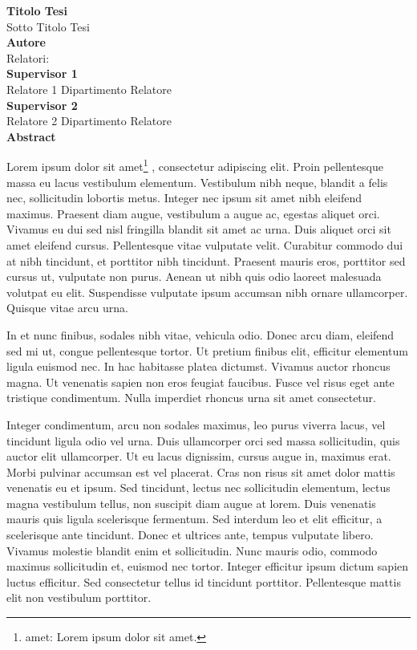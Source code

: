 \thispagestyle{plain}
\begin{center}
    \Large
    \textbf{Titolo Tesi\\}
    \vspace{0.4cm}
    \large
    Sotto Titolo Tesi\\
    \vspace{0.4cm}
    \textbf{Autore\\}
    \vspace{0.2cm}
    Relatori:\\
    \vspace{0.2cm}
    \textbf{Supervisor 1}\\
    Relatore 1 Dipartimento Relatore\\
    \textbf{Supervisor 2}\\
    Relatore 2 Dipartimento Relatore\\
    \vspace{0.9cm}
    \Huge
    \textbf{Abstract}
\end{center}


Lorem \cite{lorem_web} ipsum dolor sit amet\footnote{amet: Lorem ipsum dolor sit amet.} , consectetur adipiscing elit. Proin pellentesque massa eu lacus vestibulum elementum. Vestibulum nibh neque, blandit a felis nec, sollicitudin lobortis metus. Integer nec ipsum sit amet nibh eleifend maximus. Praesent diam augue, vestibulum a augue ac, egestas aliquet orci. Vivamus eu dui sed nisl fringilla blandit sit amet ac urna. Duis aliquet orci sit amet eleifend cursus. Pellentesque vitae vulputate velit. Curabitur commodo dui at nibh tincidunt, et porttitor nibh tincidunt. Praesent mauris eros, porttitor sed cursus ut, vulputate non purus. Aenean ut nibh quis odio laoreet malesuada volutpat eu elit. Suspendisse vulputate ipsum accumsan nibh ornare ullamcorper. Quisque vitae arcu urna.\par
In et nunc finibus, sodales nibh vitae, vehicula odio. Donec arcu diam, eleifend sed mi ut, congue pellentesque tortor. Ut pretium finibus elit, efficitur elementum ligula euismod nec. In hac habitasse platea dictumst. Vivamus auctor rhoncus magna. Ut venenatis sapien non eros feugiat faucibus. Fusce vel risus eget ante tristique condimentum. Nulla imperdiet rhoncus urna sit amet consectetur.\par
Integer condimentum, arcu non sodales maximus, leo purus viverra lacus, vel tincidunt ligula odio vel urna. Duis ullamcorper orci sed massa sollicitudin, quis auctor elit ullamcorper. Ut eu lacus dignissim, cursus augue in, maximus erat. Morbi pulvinar accumsan est vel placerat. Cras non risus sit amet dolor mattis venenatis eu et ipsum. Sed tincidunt, lectus nec sollicitudin elementum, lectus magna vestibulum tellus, non suscipit diam augue at lorem. Duis venenatis mauris quis ligula scelerisque fermentum. Sed interdum leo et elit efficitur, a scelerisque ante tincidunt. Donec et ultrices ante, tempus vulputate libero. Vivamus molestie blandit enim et sollicitudin. Nunc mauris odio, commodo maximus sollicitudin et, euismod nec tortor. Integer efficitur ipsum dictum sapien luctus efficitur. Sed consectetur tellus id tincidunt porttitor. Pellentesque mattis elit non vestibulum porttitor.\par

